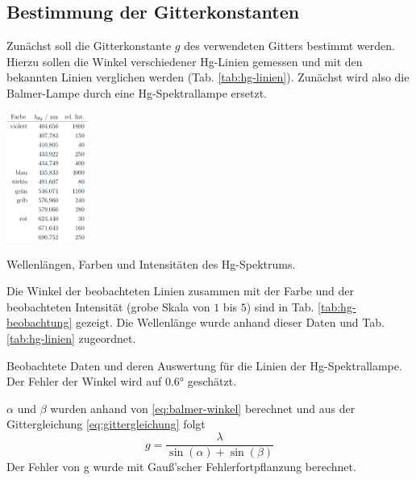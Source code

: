 \documentclass{article}
\begin{document}
\subsection{Bestimmung der Gitterkonstanten}
Zunächst soll die Gitterkonstante $g$ des verwendeten Gitters bestimmt werden.
Hierzu sollen die Winkel verschiedener Hg-Linien gemessen und mit den bekannten Linien verglichen werden (Tab. \ref{tab:hg-linien}).
Zunächst wird also die Balmer-Lampe durch eine Hg-Spektrallampe ersetzt.
\begin{table}
  \centering
  \includegraphics[width=0.2\textwidth]{hg-linien}
  \caption{Wellenlängen, Farben und Intensitäten des Hg-Spektrums. \cite{Anleitung}}
  \label{tab:hg-linien}
\end{table}

Die Winkel der beobachteten Linien zusammen mit der Farbe und der beobachteten Intensität (grobe Skala von $1$ bis $5$)
sind in Tab. \ref{tab:hg-beobachtung} gezeigt. Die Wellenlänge wurde anhand dieser Daten und Tab. \ref{tab:hg-linien} zugeordnet.
\begin{table}
  \caption{Beobachtete Daten und deren Auswertung für die Linien der Hg-Spektrallampe.
  Der Fehler der Winkel wird auf \ang{0.6} geschätzt.}
  \label{tab:hg-beobachtung}
\end{table}

$\alpha$ und $\beta$ wurden anhand von \eqref{eq:balmer-winkel} berechnet und aus der Gittergleichung \eqref{eq:gittergleichung} folgt
\[
  g = \frac{\lambda}{\sin(\alpha)+\sin(\beta)}
\]
Der Fehler von g wurde mit Gauß'scher Fehlerfortpflanzung berechnet.
\end{document}
